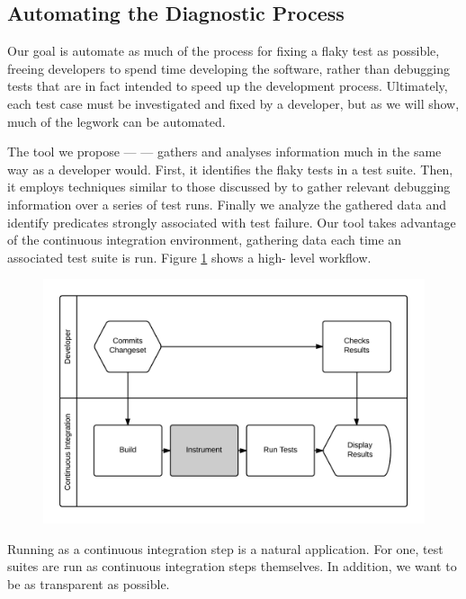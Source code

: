 \subsection{Automating the Diagnostic Process}

Our goal is automate as much of the process for fixing a flaky test as possible,
freeing developers to spend time developing the software, rather than debugging
tests that are in fact intended to speed up the development process. Ultimately,
each test case must be investigated and fixed by a developer, but as we will
show, much of the legwork can be automated.

The tool we propose --- \textit{\splatter} --- gathers and analyses information
much in the same way as a developer would. First, it identifies the flaky tests
in a test suite. Then, it employs techniques similar to those discussed by
\citet{ArumugaNainar:2010:ABI:1806799.1806839} to gather relevant debugging
information over a series of test runs. Finally we analyze the gathered data and
identify predicates strongly associated with test failure. Our tool takes
advantage of the continuous integration environment, gathering data each time an
associated test suite is run. Figure \ref{fig:developer_workflow} shows a high-
level \splatter workflow.

\begin{figure}[h]

\includegraphics[width=\linewidth]{Images/developer_workflow}

\caption{}
\label{fig:developer_workflow}
\end{figure}

Running as a continuous integration step is a natural application. For one, test
suites are run as continuous integration steps themselves. In addition, we want
to be as transparent as possible.

